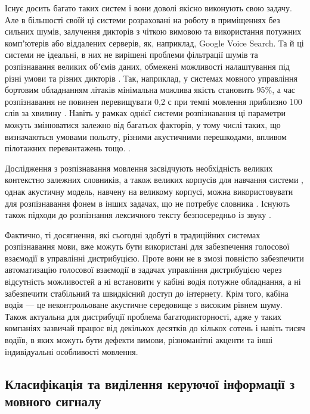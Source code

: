 Існує досить багато таких систем і вони доволі якісно виконують свою задачу. Але в більшості своїй ці системи розраховані на роботу в приміщеннях без сильних шумів, залучення дикторів з чіткою вимовою та використання потужних компʼютерів або віддалених серверів, як, наприклад, Google Voice Search. Та й ці системи не ідеальні, в них не вирішені проблеми фільтрації шумів та розпізнавання великих обʼємів даних, обмежені можливості налаштування під різні умови та різних дикторів \cite{Volkov_2014}. Так, наприклад, у системах мовного управління бортовим обладнанням літаків мінімальна можлива якість становить 95\%, а час розпізнавання не повинен перевищувати 0,2 с при темпі мовлення приблизно 100 слів за хвилину \cite{Bondaros_2007}. Навіть у рамках однієї системи розпізнавання ці параметри можуть змінюватися залежно від багатьох факторів, у тому числі таких, що визначаються умовами польоту, різними акустичними перешкодами, впливом пілотажних перевантажень тощо. \cite{Korsun_2013}.

Дослідження з розпізнавання мовлення засвідчують необхідність великих контекстно залежних словників, а також великих корпусів для навчання системи \cite{Pylypenko_2008,Pylypenko_2009,Pylypenko_2010,Lydovyk_2011,Vasilyeva_2012,Womack_1999,Zirneeva_2008,Gladunov_2005}, однак акустичну модель, навчену на великому корпусі, можна використовувати для розпізнавання фонем в інших задачах, що не потребує словника \cite{Pylypenko_2008,Robeyko_2012,Abdel_2012,Zhang_2017,Sharma_2018,Yermolenko_2008}. Існують також підходи до розпізнання лексичного тексту безпосередньо із звуку \cite{He_2019}.

Фактично, ті досягнення, які сьогодні здобуті в традиційних системах розпізнавання мови, вже можуть бути використані для забезпечення голосової взаємодії в управлінні дистрибуцією. Проте вони не в змозі повністю забезпечити автоматизацію голосової взаємодії в задачах управління дистрибуцією через відсутність можливостей а ні встановити у кабіні водія потужне обладнання, а ні забезпечити стабільний та швидкісний доступ до інтернету. Крім того, кабіна водія — це неконтрольоване акустичне середовище з високим рівнем шуму. Також актуальна для дистрибуції проблема багатодикторності, адже у таких компаніях зазвичай працює від декількох десятків до кількох сотень і навіть тисяч водіїв, в яких можуть бути дефекти вимови, різноманітні акценти та інші індивідуальні особливості мовлення.

\subsection{Класифікація та виділення керуючої інформації з мовного сигналу}

